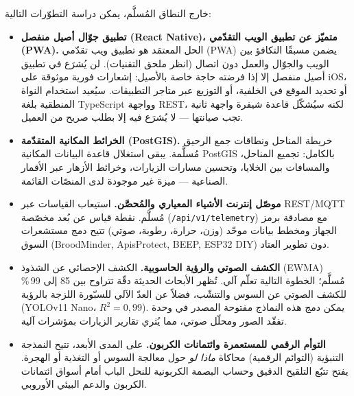 خارج النطاق المُسلَّم، يمكن دراسة التطوّرات التالية:
\begin{itemize}
  \item \textbf{تطبيق جوّال أصيل منفصل (\textenglish{React Native})، متميّز عن تطبيق
  الويب التقدّمي (\textenglish{PWA}).} الحل المعتمَد هو تطبيق ويب تقدّمي
  (\textenglish{PWA}) يضمن مسبقًا التكافؤ بين الويب والجوّال والعمل دون اتصال (انظر
  ملحق التقنيات). لن يُشرَع في تطبيق أصيل منفصل إلا إذا فرضته حاجة خاصة بالأصيل:
  إشعارات فورية موثوقة على \textenglish{iOS}، أو تحديد الموقع في الخلفية، أو التوزيع
  عبر متاجر التطبيقات. سيُعيد استخدام النواة المنطقية بلغة \textenglish{TypeScript}
  وواجهة \textenglish{REST}، لكنه سيُشكّل قاعدة شيفرة واجهة ثانية تجب صيانتها --- لا
   يُشرَع فيه إلا بطلب صريح من العميل.

  \item \textbf{الخرائط المكانية المتقدّمة (\textenglish{PostGIS}).}
  خريطة المناحل ونطاقات جمع الرحيق مُسلَّمة. يبقى استغلال قاعدة البيانات المكانية
  \textenglish{PostGIS} بالكامل: تجميع المناحل، والمسافات بين الخلايا، وتحسين مسارات
  الزيارات، وخرائط الأزهار عبر الأقمار الصناعية --- ميزة غير موجودة لدى المنصّات
  القائمة.

  \item \textbf{موصّل إنترنت الأشياء المعياري والمُحصَّن.}
  استيعاب القياسات عبر \textenglish{REST/MQTT} مُسلَّم. نقطة قياس عن بُعد مخصّصة
  (\texttt{/api/v1/telemetry}) مع مصادقة برمز الجهاز ومخطط بيانات موحّد (وزن، حرارة،
  رطوبة، صوتي) تتيح دمج مستشعرات السوق (\textenglish{BroodMinder, ApisProtect, BEEP,
  ESP32 DIY}) دون تطوير العتاد.

  \item \textbf{الكشف الصوتي والرؤية الحاسوبية.}
  الكشف الإحصائي عن الشذوذ (\textenglish{EWMA}) مُسلَّم؛ الخطوة التالية تعلّم آلي.
  تُظهر الأبحاث الحديثة دقّة تتراوح بين 85 إلى 99\,\% للكشف الصوتي عن السوس
  والتنشّب، فضلاً عن العدّ الآلي للسبّورة اللزجة بالرؤية
  (\textenglish{YOLOv11 Nano}، $R^2 = 0{,}99$). يمكن دمج هذه النماذج مفتوحة
  المصدر في وحدة تفقّد الصور ومحلّل صوتي، مما يُثري تقارير الزيارات بمؤشرات
  آلية.

  \item \textbf{التوأم الرقمي للمستعمرة وائتمانات الكربون.}
  على المدى الأبعد، تتيح النمذجة التنبؤية (التوائم الرقمية) محاكاة
  \emph{ماذا لو} حول معالجة السوس أو التغذية أو الهجرة. يفتح تتبّع
  التلقيح الدقيق وحساب البصمة الكربونية للنحل الباب أمام أسواق ائتمانات
  الكربون والدعم البيئي الأوروبي.
\end{itemize}
